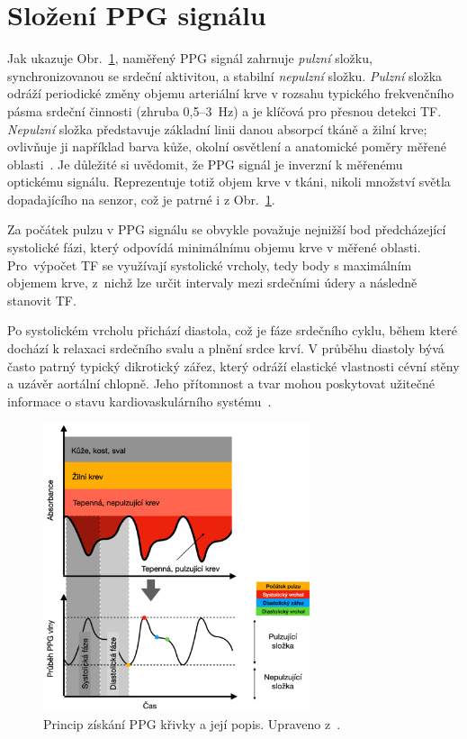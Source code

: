 \section{Složení \acs{PPG} signálu}

Jak ukazuje Obr.~\ref{fig:signalPPG}, naměřený \acs{PPG} signál zahrnuje \textit{pulzní} složku, synchronizovanou se srdeční aktivitou, a stabilní \textit{nepulzní} složku.
\textit{Pulzní} složka odráží periodické změny objemu arteriální krve v rozsahu typického frekvenčního pásma srdeční činnosti (zhruba 0{,}5--3~Hz) a je klíčová pro přesnou detekci \acs{TF}.
\textit{Nepulzní} složka představuje základní linii danou absorpcí tkáně a žilní krve; ovlivňuje ji například barva kůže, okolní osvětlení a anatomické poměry měřené oblasti~\cite{ENIKÖ, Park2022}.
Je důležité si uvědomit, že \acs{PPG} signál je inverzní k měřenému optickému signálu.
Reprezentuje totiž objem krve v tkáni, nikoli množství světla dopadajícího na senzor, což je patrné i z Obr.~\ref{fig:signalPPG}.

Za počátek pulzu v \acs{PPG} signálu se obvykle považuje nejnižší bod předcházející systolické fázi, který odpovídá minimálnímu objemu krve v měřené oblasti.
Pro~výpočet \acs{TF} se využívají systolické vrcholy, tedy body s maximálním objemem krve, z~nichž lze určit intervaly mezi srdečními údery a následně stanovit \acs{TF}.

Po systolickém vrcholu přichází diastola, což je fáze srdečního cyklu, během které dochází k relaxaci srdečního svalu a plnění srdce krví.
V průběhu diastoly bývá často patrný typický dikrotický zářez, který odráží elastické vlastnosti cévní stěny a uzávěr aortální chlopně.
Jeho přítomnost a tvar mohou poskytovat užitečné informace o stavu kardiovaskulárního systému~\cite{Orphanidou2018, Park2022}.

\begin{figure}[hb]
	\centering
	\includegraphics[width=0.7\textwidth]{./obrazky/signalPPG.png}
	\caption[Fiziologický popis PPG signálu]{Princip získání \acs{PPG} křivky a její popis. Upraveno z~\cite{Park2022}.}
	\label{fig:signalPPG}
\end{figure}